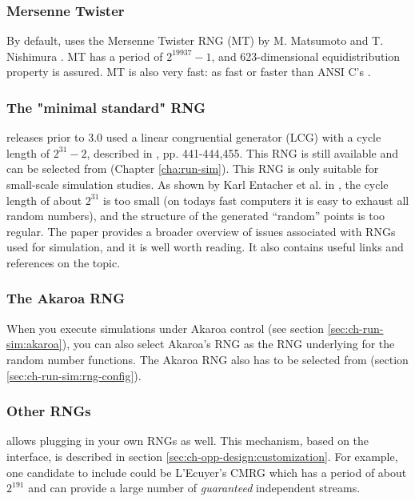 \subsubsection{Mersenne Twister}

By default, {\opp} uses the Mersenne Twister RNG (MT) by M. Matsumoto and
T. Nishimura \cite{Matsumoto98}. MT has a period of $2^{19937}-1$,
and 623-dimensional equidistribution property is assured. MT is
also very fast: as fast or faster than ANSI C's .

\subsubsection{The "minimal standard" RNG}

{\opp} releases prior to 3.0 used a linear congruential generator
(LCG) with a cycle length of $2^{31}-2$, described in
\cite{Jain91}, pp. 441-444,455. This RNG is still available
and can be selected from  (Chapter \ref{cha:run-sim}).
This RNG is only suitable for small-scale simulation studies.
As shown by Karl Entacher et al. in \cite{Entacher02},
the cycle length of about $2^{31}$ is too small (on todays
fast computers it is easy to exhaust all random numbers), and
the structure of the generated ``random'' points is too regular.
The \cite{Hellekalek98} paper provides a broader overview of issues
associated with RNGs used for simulation, and it is well worth reading.
It also contains useful links and references on the topic.

\subsubsection{The Akaroa RNG}

When you execute simulations under Akaroa control (see section
\ref{sec:ch-run-sim:akaroa}), you can also select Akaroa's
RNG as the RNG underlying for the {\opp} random number functions.
The Akaroa RNG also has to be selected from 
(section \ref{sec:ch-run-sim:rng-config}).

\subsubsection{Other RNGs}

{\opp} allows plugging in your own RNGs as well. This mechanism,
based on the  interface, is described in section
\ref{sec:ch-opp-design:customization}.
For example, one candidate to include could be L'Ecuyer's CMRG \cite{LEcuyer02}
which has a period of about $2^{191}$ and can provide a large
number of \textit{guaranteed} independent streams.


